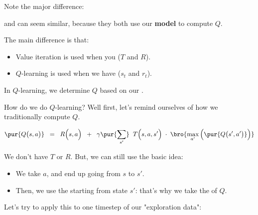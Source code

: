         Note the major difference:\\

        \begin{clarification}
             and  can seem similar, because they both use our \textbf{model} to compute $Q$.

            The main difference is that:

            \begin{itemize}
                \item Value iteration is used when you  ($T$ and $R$).

                \item $Q$-learning is used when we have  ($s_t$ and $r_t$).
            \end{itemize}

            In $Q$-learning, we determine $Q$ based on our .
        \end{clarification}

        \phantom{}

        \subsecdiv

        \phantom{}

        How do we do $Q$-learning? Well first, let's remind ourselves of how we traditionally compute $Q$.

        \begin{equation}
            \pur{Q\big(s,a \big)} \;\;=\;\; 
                    R \Big( s,a \Big)
                \;\;+\;\;
                \gamma
                \pur{\sum_{s'}}  
                    \;\;
                    T \Big(          s,a,s' \Big)
                    \;\cdot\; 
                    \bro{ \max_{a'} \Big( \pur{Q\big(s',a' \big)} \Big)}
        \end{equation}

        We don't have $T$ or $R$. But, we can still use the basic idea:

        \begin{itemize}
            \item We take  $a$, and end up going from  $s$ to $s'$.
            \item Then, we use the  starting from state $s'$: that's why we take the \pur{$\max$} of $Q$.
        \end{itemize}

        Let's try to apply this to one timestep of our "exploration data":

